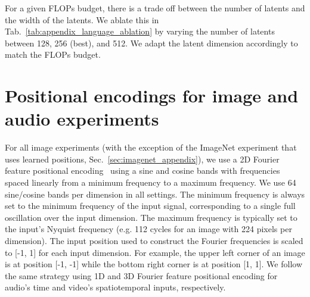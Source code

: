 \documentclass{article} \usepackage{iclr2022_conference,times}
\newcommand{\ourmodel}{Perceiver IO\xspace}
\begin{document}
For a given FLOPs budget, there is a trade off between the number of latents  and the width  of the latents. We ablate this in Tab.~\ref{tab:appendix_language_ablation} by varying the number of latents between 128, 256 (best), and 512. We adapt the latent dimension accordingly to match the FLOPs budget.

\begin{table}[h]
\centering
{}
\vspace{1mm}
\caption{\small \label{tab:appendix_language_ablation} Ablation on the UTF-8 Bytes \ourmodel{} latent width versus depth.}
\end{table}


\section{Positional encodings for image and audio experiments}
\label{sec:fourier_pos_enc}

For all image experiments (with the exception of the ImageNet experiment that uses learned positions, Sec.~\ref{sec:imagenet_appendix}), we use a 2D Fourier feature positional encoding~\citep{vaswani2017attention, stanley2007compositional, mildenhall2020nerf, tancik2020fourier} using a sine and cosine bands with frequencies spaced linearly from a minimum frequency to a maximum frequency. We use 64 sine/cosine bands per dimension in all settings. The minimum frequency is always set to the minimum frequency of the input signal, corresponding to a single full oscillation over the input dimension. The maximum frequency is typically set to the input's Nyquist frequency (e.g. 112 cycles for an image with 224 pixels per dimension). The input position used to construct the Fourier frequencies is scaled to [-1, 1] for each input dimension. For example, the upper left corner of an image is at position [-1, -1] while the bottom right corner is at position [1, 1]. We follow the same strategy using 1D and 3D Fourier feature positional encoding for audio's time and video's spatiotemporal inputs, respectively.
\end{document}
